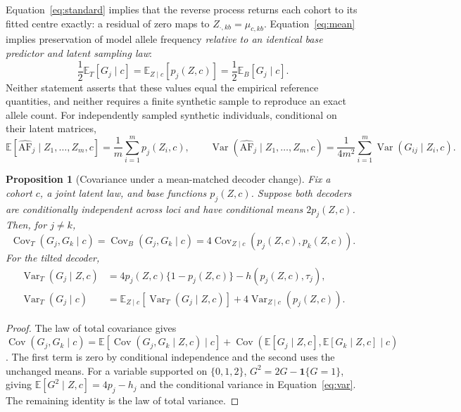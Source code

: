 \documentclass[11pt,a4paper]{article}
\newtheorem{proposition}{Proposition}
\newcommand{\E}{\mathbb{E}}
\newcommand{\Var}{\operatorname{Var}}
\newcommand{\Cov}{\operatorname{Cov}}
\newcommand{\ind}{\mathbf{1}}
\begin{document}
Equation~\eqref{eq:standard} implies that the reverse process returns each
cohort to its fitted centre exactly: a residual of zero maps to
$Z_{\cdot,kb}=\mu_{c,kb}$. Equation~\eqref{eq:mean} implies preservation of
model allele frequency \emph{relative to an identical base predictor and
latent sampling law}:
\begin{equation}
 \frac12\E_T[G_j\mid c]
 =\E_{Z\mid c}[p_j(Z,c)]
 =\frac12\E_B[G_j\mid c].
 \label{eq:afproperty}
\end{equation}
Neither statement asserts that these values equal the empirical reference
quantities, and neither requires a finite synthetic sample to reproduce an
exact allele count. For independently sampled synthetic individuals,
conditional on their latent matrices,
\begin{equation}
 \E\!\left[\widehat{\mathrm{AF}}_j\mid Z_1,\ldots,Z_m,c\right]
 =\frac1m\sum_{i=1}^{m}p_j(Z_i,c),\qquad
 \Var\!\left(\widehat{\mathrm{AF}}_j\mid Z_1,\ldots,Z_m,c\right)
 =\frac{1}{4m^2}\sum_{i=1}^m\Var(G_{ij}\mid Z_i,c).
 \label{eq:finiteaf}
\end{equation}

\begin{proposition}[Covariance under a mean-matched decoder change]
\label{prop:cov}
Fix a cohort $c$, a joint latent law, and base functions $p_j(Z,c)$. Suppose
both decoders are conditionally independent across loci and have conditional
means $2p_j(Z,c)$. Then, for $j\ne k$,
\begin{equation}
 \Cov_T(G_j,G_k\mid c)
 =\Cov_B(G_j,G_k\mid c)
 =4\Cov_{Z\mid c}(p_j(Z,c),p_k(Z,c)).
 \label{eq:cov}
\end{equation}
For the tilted decoder,
\begin{align}
 \Var_T(G_j\mid Z,c)
 &=4p_j(Z,c)\{1-p_j(Z,c)\}-h(p_j(Z,c),\tau_j),\\
 \Var_T(G_j\mid c)
 &=\E_{Z\mid c}[\Var_T(G_j\mid Z,c)]
      +4\Var_{Z\mid c}(p_j(Z,c)).
 \label{eq:var}
\end{align}
\end{proposition}

\begin{proof}
The law of total covariance gives
$\Cov(G_j,G_k\mid c)=\E[\Cov(G_j,G_k\mid Z,c)\mid c]
+\Cov(\E[G_j\mid Z,c],\E[G_k\mid Z,c]\mid c)$.
The first term is zero by conditional independence and the second uses the
unchanged means. For a variable supported on $\{0,1,2\}$,
$G^2=2G-\ind\{G=1\}$, giving
$\E[G^2\mid Z,c]=4p_j-h_j$ and the conditional variance in
Equation~\eqref{eq:var}. The remaining identity is the law of total variance.
\end{proof}
\end{document}
